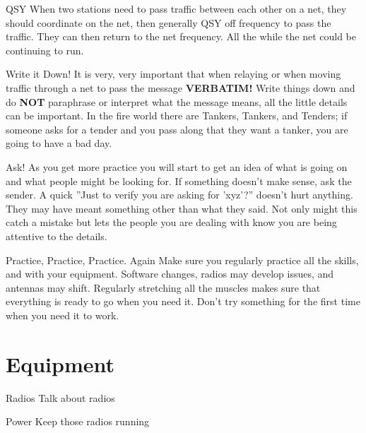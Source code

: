 \documentclass[11pt]{beamer}
\begin{document}
\begin{frame}{QSY}
When two stations need to pass traffic between each other on a net, they should coordinate on the net, then generally QSY off frequency to pass the traffic. They can then return to the net frequency. All the while the net could be continuing to run.
\end{frame}

\begin{frame}{Write it Down!}
It is very, very important that when relaying or when moving traffic through a net to pass the message \textbf{VERBATIM!} Write things down and do \textbf{NOT} paraphrase or interpret what the message means, all the little details can be important. In the fire world there are Tankers, Tankers, and Tenders; if someone asks for a tender and you pass along that they want a tanker, you are going to have a bad day.
\end{frame}

\begin{frame}{Ask!}
As you get more practice you will start to get an idea of what is going on and what people might be looking for. If something doesn't make sense, ask the sender. A quick ''Just to verify you are asking for 'xyz'?'' doesn't hurt anything. They may have meant something other than what they said. Not only might this catch a mistake but lets the people you are dealing with know you are being attentive to the details.
\end{frame}

\begin{frame}{Practice, Practice, Practice. Again}
Make sure you regularly practice all the skills, and with your equipment. Software changes, radios may develop issues, and antennas may shift. Regularly stretching all the muscles makes sure that everything is ready to go when you need it. Don't try something for the first time when you need it to work.
\end{frame}

\section{Equipment}

\begin{frame}{Radios}
Talk about radios
\end{frame}

\begin{frame}{Power}
Keep those radios running
\end{frame}
\end{document}
